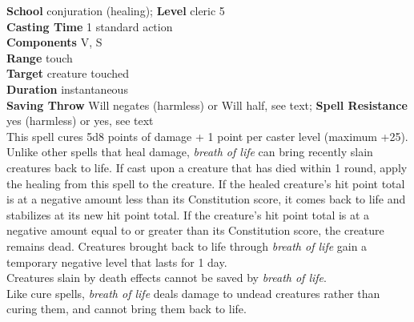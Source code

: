 \textbf{School }conjuration (healing); \textbf{Level }cleric 5\\
\textbf{Casting Time }1 standard action\\
\textbf{Components }V, S\\
\textbf{Range }touch\\
\textbf{Target }creature touched\\
\textbf{Duration }instantaneous\\
\textbf{Saving Throw} Will negates (harmless) or Will half, see text; \textbf{Spell Resistance} yes (harmless) or yes, see text\\
This spell cures 5d8 points of damage + 1 point per caster level (maximum +25). \\
Unlike other spells that heal damage, \textit{breath of life} can bring recently slain creatures back to life. If cast upon a creature that has died within 1 round, apply the healing from this spell to the creature. If the healed creature's hit point total is at a negative amount less than its Constitution score, it comes back to life and stabilizes at its new hit point total. If the creature's hit point total is at a negative amount equal to or greater than its Constitution score, the creature remains dead. Creatures brought back to life through \textit{breath of life} gain a temporary negative level that lasts for 1 day.\\
Creatures slain by death effects cannot be saved by \textit{breath of life}.\\
Like cure spells, \textit{breath of life} deals damage to undead creatures rather than curing them, and cannot bring them back to life.\\
